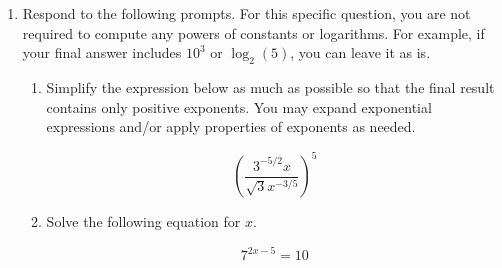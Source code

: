 \documentclass[11pt]{article}
\begin{document}
\begin{enumerate}
\begin{enumerate}
    \vfill

    \item Rank the values of $s'(10)$, $s'(14)$, and $s'(19)$ from smallest to largest. No explanation required.

    \vspace{0.5cm}
    
    \begin{center}
    \large{\rule[-8pt]{2cm}{0.4pt}$<$\rule[-8pt]{2cm}{0.4pt}$<$\rule[-8pt]{2cm}{0.4pt}}
    \end{center}
\end{enumerate}


\newpage


\item Respond to the following prompts. For this specific question, you are not required to compute any powers of constants or logarithms. For example, if your final answer includes $10^3$ or $\log_2(5)$, you can leave it as is.

\begin{enumerate}
    \item Simplify the expression below as much as possible so that the final result contains only positive exponents. You may expand exponential expressions and/or apply properties of exponents as needed. 

    \[\left(\dfrac{3^{-5/2}x}{\sqrt{3}x^{-3/5}}\right)^5\]


    \vfill

    \item Solve the following equation for $x$. 

    \[7^{2x-5}=10\]

    \vfill
\end{enumerate}



\newpage



\end{enumerate}
\end{document}

